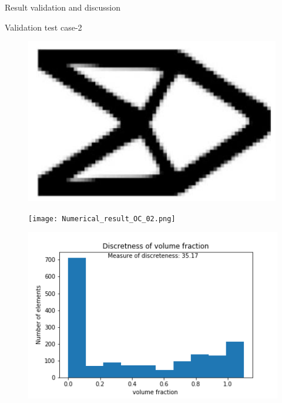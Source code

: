 \documentclass[a4paper,12pt,times]{article}
\begin{document}
\begin{section}{Result validation and discussion}
\begin{subsection}{Validation test case-2}
\begin{figure}[H]
	\centering
	\begin{minipage}{.5\textwidth}
		\centering
		\includegraphics[width=1\linewidth]{analytical_OC_2.png}
		\label{VC-04.1}
	\end{minipage}%
	\begin{minipage}{.5\textwidth}
		\centering
		\texttt{[image: Numerical\_result\_OC\_02.png]}
		\label{VC-04.2}
	\end{minipage}
\end{figure} 
\begin{figure}[H]
	\centering
	\begin{minipage}{.5\textwidth}
		\centering
		\includegraphics[width=1\linewidth]{OC_02_discretness.png}

\end{minipage}
\end{figure}
\end{subsection}
\end{section}
\end{document}
